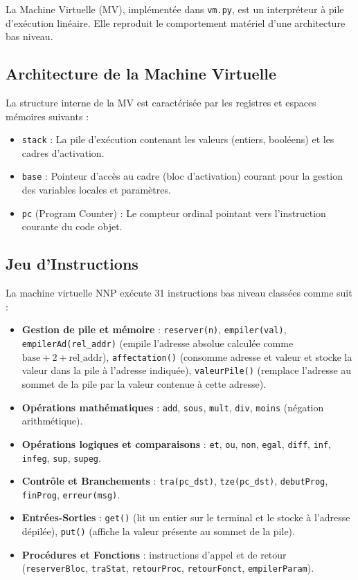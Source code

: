 \documentclass[a4paper, 12pt]{article}
\begin{document}
La Machine Virtuelle (MV), implémentée dans \texttt{vm.py}, est un interpréteur à pile d'exécution linéaire. Elle reproduit le comportement matériel d'une architecture bas niveau.

\subsection{Architecture de la Machine Virtuelle}
La structure interne de la MV est caractérisée par les registres et espaces mémoires suivants :
\begin{itemize}
    \item \texttt{stack} : La pile d'exécution contenant les valeurs (entiers, booléens) et les cadres d'activation.
    \item \texttt{base} : Pointeur d'accès au cadre (bloc d'activation) courant pour la gestion des variables locales et paramètres.
    \item \texttt{pc} (Program Counter) : Le compteur ordinal pointant vers l'instruction courante du code objet.
\end{itemize}

\subsection{Jeu d'Instructions}
La machine virtuelle NNP exécute 31 instructions bas niveau classées comme suit :
\begin{itemize}
    \item \textbf{Gestion de pile et mémoire} : \texttt{reserver(n)}, \texttt{empiler(val)}, \texttt{empilerAd(}\allowbreak\texttt{rel\_addr)} (empile l'adresse absolue calculée comme $\text{base} + 2 + \text{rel\_addr}$), \texttt{affectation()} (consomme adresse et valeur et stocke la valeur dans la pile à l'adresse indiquée), \texttt{valeurPile()} (remplace l'adresse au sommet de la pile par la valeur contenue à cette adresse).
    \item \textbf{Opérations mathématiques} : \texttt{add}, \texttt{sous}, \texttt{mult}, \texttt{div}, \texttt{moins} (négation arithmétique).
    \item \textbf{Opérations logiques et comparaisons} : \texttt{et}, \texttt{ou}, \texttt{non}, \texttt{egal}, \texttt{diff}, \texttt{inf}, \texttt{infeg}, \texttt{sup}, \texttt{supeg}.
    \item \textbf{Contrôle et Branchements} : \texttt{tra(pc\_dst)}, \texttt{tze(pc\_dst)}, \texttt{debutProg}, \texttt{finProg}, \texttt{erreur(msg)}.
    \item \textbf{Entrées-Sorties} : \texttt{get()} (lit un entier sur le terminal et le stocke à l'adresse dépilée), \texttt{put()} (affiche la valeur présente au sommet de la pile).
    \item \textbf{Procédures et Fonctions} : instructions d'appel et de retour (\texttt{reserverBloc}, \texttt{traStat}, \texttt{retourProc}, \texttt{retourFonct}, \texttt{empilerParam}).
\end{itemize}
\end{document}
